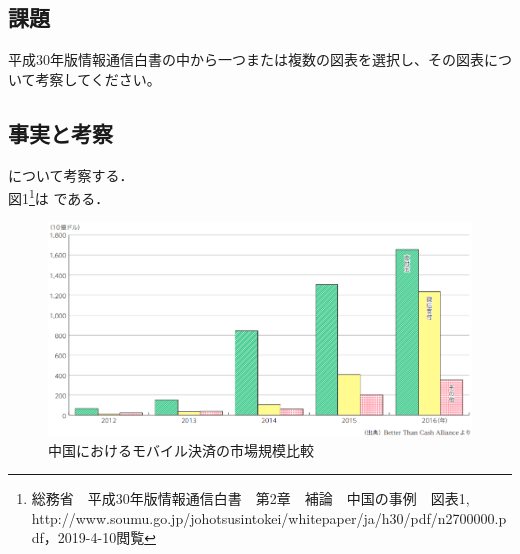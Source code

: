 


\pagestyle{fancy}
\subsection{課題}
平成30年版情報通信白書の中から一つまたは複数の図表を選択し、その図表について考察してください。

\subsection{事実と考察}
について考察する．\\
図1\footnote{総務省　平成30年版情報通信白書　第2章　補論　中国の事例　図表1,\\http://www.soumu.go.jp/johotsusintokei/whitepaper/ja/h30/pdf/n2700000.pdf，2019-4-10閲覧}は である．

\begin{figure}[H]
  \centering
  \includegraphics[width=13cm]{./imgs/1.png}
  \caption{中国におけるモバイル決済の市場規模比較}
\end{figure}



